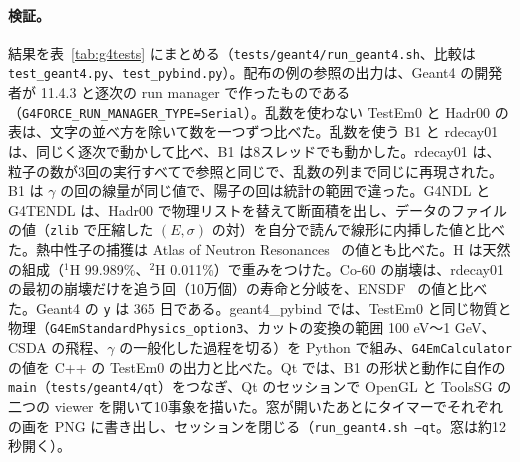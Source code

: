 \documentclass[a4paper,10pt]{ltjsarticle}
\begin{document}
\paragraph{検証。}結果を表~\ref{tab:g4tests} にまとめる（\nolinkurl{tests/geant4/run_geant4.sh}、比較は \texttt{test\_geant4.py}、\texttt{test\_pybind.py}）。配布の例の参照の出力は、Geant4 の開発者が 11.4.3 と逐次の run manager で作ったものである（\texttt{G4FORCE\_RUN\_MANAGER\_TYPE=Serial}）。乱数を使わない TestEm0 と Hadr00 の表は、文字の並べ方を除いて数を一つずつ比べた。乱数を使う B1 と rdecay01 は、同じく逐次で動かして比べ、B1 は8スレッドでも動かした。rdecay01 は、粒子の数が3回の実行すべてで参照と同じで、乱数の列まで同じに再現された。B1 は $\gamma$ の回の線量が同じ値で、陽子の回は統計の範囲で違った。G4NDL と G4TENDL は、Hadr00 で物理リストを替えて断面積を出し、データのファイルの値（\texttt{zlib} で圧縮した $(E,\sigma)$ の対）を自分で読んで線形に内挿した値と比べた。熱中性子の捕獲は Atlas of Neutron Resonances~\cite{atlas} の値とも比べた。H は天然の組成（$^1$H 99.989\%、$^2$H 0.011\%）で重みをつけた。Co-60 の崩壊は、rdecay01 の最初の崩壊だけを追う回（10万個）の寿命と分岐を、ENSDF~\cite{ensdf60} の値と比べた。Geant4 の \texttt{y} は 365 日である。geant4\_pybind では、TestEm0 と同じ物質と物理（\texttt{G4EmStandardPhysics\_option3}、カットの変換の範囲 100 eV〜1 GeV、CSDA の飛程、$\gamma$ の一般化した過程を切る）を Python で組み、\texttt{G4EmCalculator} の値を C++ の TestEm0 の出力と比べた。Qt では、B1 の形状と動作に自作の \texttt{main}（\nolinkurl{tests/geant4/qt}）をつなぎ、Qt のセッションで OpenGL と ToolsSG の二つの viewer を開いて10事象を描いた。窓が開いたあとにタイマーでそれぞれの画を PNG に書き出し、セッションを閉じる（\texttt{run\_geant4.sh --qt}。窓は約12秒開く）。
\end{document}
